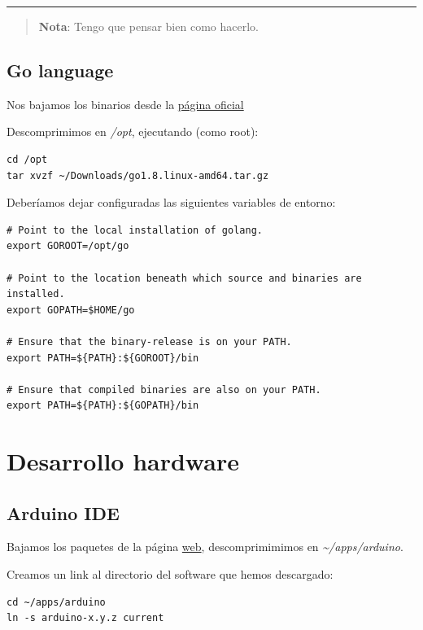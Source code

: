 \documentclass[12pt,spanish,]{scrartcl}
\begin{document}
\begin{center}\rule{0.5\linewidth}{\linethickness}\end{center}

\begin{quote}
\textbf{Nota}: Tengo que pensar bien como hacerlo.
\end{quote}

\subsection{Go language}\label{go-language}

Nos bajamos los binarios desde la \href{https://golang.org/dl/}{página
oficial}

Descomprimimos en \emph{/opt}, ejecutando (como root):

\begin{verbatim}
cd /opt
tar xvzf ~/Downloads/go1.8.linux-amd64.tar.gz 
\end{verbatim}

Deberíamos dejar configuradas las siguientes variables de entorno:

\begin{verbatim}
# Point to the local installation of golang.
export GOROOT=/opt/go

# Point to the location beneath which source and binaries are installed.
export GOPATH=$HOME/go

# Ensure that the binary-release is on your PATH.
export PATH=${PATH}:${GOROOT}/bin

# Ensure that compiled binaries are also on your PATH.
export PATH=${PATH}:${GOPATH}/bin
\end{verbatim}

\section{Desarrollo hardware}\label{desarrollo-hardware}

\subsection{Arduino IDE}\label{arduino-ide}

Bajamos los paquetes de la página \href{https://www.arduino.cc}{web},
descomprimimimos en \emph{\textasciitilde{}/apps/arduino}.

Creamos un link al directorio del software que hemos descargado:

\begin{verbatim}
cd ~/apps/arduino
ln -s arduino-x.y.z current
\end{verbatim}
\end{document}
